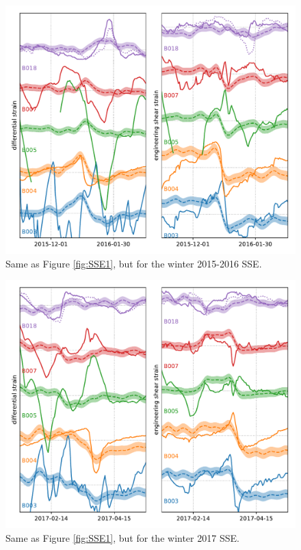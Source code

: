 \begin{figure}
\includegraphics{ch5/appendix_figures/SSE6.pdf}
\caption{Same as Figure \ref{fig:SSE1}, but for the winter 2015-2016 SSE.}   
\label{fig:SSE6}
\end{figure}

\begin{figure}
\includegraphics{ch5/appendix_figures/SSE7.pdf}
\caption{Same as Figure \ref{fig:SSE1}, but for the winter 2017 SSE.}   
\label{fig:SSE7}
\end{figure}
